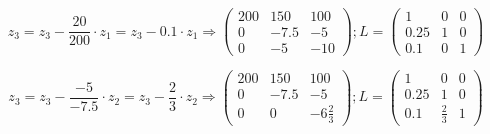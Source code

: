 \[ z_3 = z_3 - \frac{20}{200} \cdot z_1 = z_3 - 0.1 \cdot z_1 \Rightarrow \left( \begin{array}{ccc}
200 & 150 & 100\\
0 & -7.5 & -5\\
0 & -5 & -10 \end{array}\right); L= \left( \begin{array}{ccc}
1 & 0 & 0\\
0.25 & 1 & 0\\
0.1 & 0 & 1\end{array} \right) \]

\[ z_3 = z_3 - \frac{-5}{-7.5} \cdot z_2 = z_3 - \frac{2}{3} \cdot z_2 \Rightarrow \left( \begin{array}{ccc}
200 & 150 & 100\\
0 & -7.5 & -5\\
0 & 0 & -6\frac{2}{3} \end{array}\right); L= \left( \begin{array}{ccc}
1 & 0 & 0\\
0.25 & 1 & 0\\
0.1 & \frac{2}{3} & 1\end{array} \right) \]

